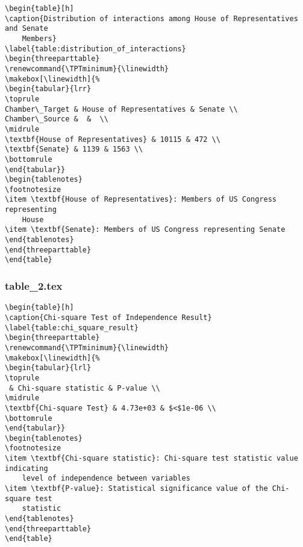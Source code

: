\documentclass[11pt]{article}
\begin{document}
\begin{Verbatim}[tabsize=4]
\begin{table}[h]
\caption{Distribution of interactions among House of Representatives and Senate
	Members}
\label{table:distribution_of_interactions}
\begin{threeparttable}
\renewcommand{\TPTminimum}{\linewidth}
\makebox[\linewidth]{%
\begin{tabular}{lrr}
\toprule
Chamber\_Target & House of Representatives & Senate \\
Chamber\_Source &  &  \\
\midrule
\textbf{House of Representatives} & 10115 & 472 \\
\textbf{Senate} & 1139 & 1563 \\
\bottomrule
\end{tabular}}
\begin{tablenotes}
\footnotesize
\item \textbf{House of Representatives}: Members of US Congress representing
	House
\item \textbf{Senate}: Members of US Congress representing Senate
\end{tablenotes}
\end{threeparttable}
\end{table}

\end{Verbatim}

\subsubsection*{table\_2.tex}

\begin{Verbatim}[tabsize=4]
\begin{table}[h]
\caption{Chi-square Test of Independence Result}
\label{table:chi_square_result}
\begin{threeparttable}
\renewcommand{\TPTminimum}{\linewidth}
\makebox[\linewidth]{%
\begin{tabular}{lrl}
\toprule
 & Chi-square statistic & P-value \\
\midrule
\textbf{Chi-square Test} & 4.73e+03 & $<$1e-06 \\
\bottomrule
\end{tabular}}
\begin{tablenotes}
\footnotesize
\item \textbf{Chi-square statistic}: Chi-square test statistic value indicating
	level of independence between variables
\item \textbf{P-value}: Statistical significance value of the Chi-square test
	statistic
\end{tablenotes}
\end{threeparttable}
\end{table}

\end{Verbatim}




\end{document}
